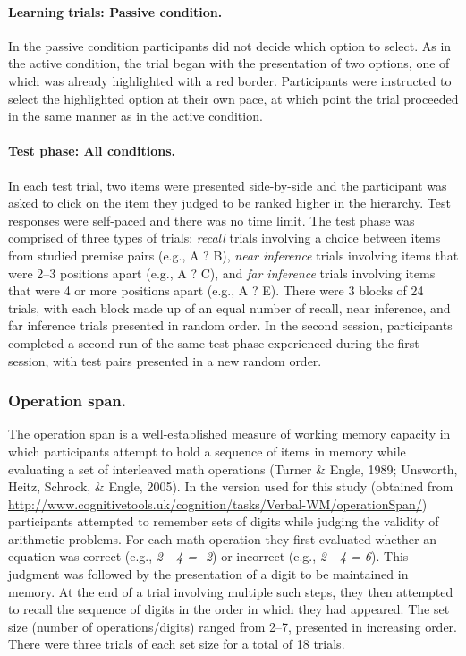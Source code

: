 \documentclass[floatsintext,man]{apa6}
\theoremstyle{definition}
\theoremstyle{definition}
\theoremstyle{definition}
\theoremstyle{remark}
\begin{document}
\paragraph{Learning trials: Passive
condition.}\label{learning-trials-passive-condition.}

In the passive condition participants did not decide which option to
select. As in the active condition, the trial began with the
presentation of two options, one of which was already highlighted with a
red border. Participants were instructed to select the highlighted
option at their own pace, at which point the trial proceeded in the same
manner as in the active condition.

\paragraph{Test phase: All
conditions.}\label{test-phase-all-conditions.}

In each test trial, two items were presented side-by-side and the
participant was asked to click on the item they judged to be ranked
higher in the hierarchy. Test responses were self-paced and there was no
time limit. The test phase was comprised of three types of trials:
\emph{recall} trials involving a choice between items from studied
premise pairs (e.g., A ? B), \emph{near inference} trials involving
items that were 2--3 positions apart (e.g., A ? C), and \emph{far
inference} trials involving items that were 4 or more positions apart
(e.g., A ? E). There were 3 blocks of 24 trials, with each block made up
of an equal number of recall, near inference, and far inference trials
presented in random order. In the second session, participants completed
a second run of the same test phase experienced during the first
session, with test pairs presented in a new random order.

\subsubsection{Operation span.}\label{operation-span.}

The operation span is a well-established measure of working memory
capacity in which participants attempt to hold a sequence of items in
memory while evaluating a set of interleaved math operations (Turner \&
Engle, 1989; Unsworth, Heitz, Schrock, \& Engle, 2005). In the version
used for this study (obtained from
\url{http://www.cognitivetools.uk/cognition/tasks/Verbal-WM/operationSpan/})
participants attempted to remember sets of digits while judging the
validity of arithmetic problems. For each math operation they first
evaluated whether an equation was correct (e.g., \emph{2 - 4 = -2}) or
incorrect (e.g., \emph{2 - 4 = 6}). This judgment was followed by the
presentation of a digit to be maintained in memory. At the end of a
trial involving multiple such steps, they then attempted to recall the
sequence of digits in the order in which they had appeared. The set size
(number of operations/digits) ranged from 2--7, presented in increasing
order. There were three trials of each set size for a total of 18
trials.
\end{document}
